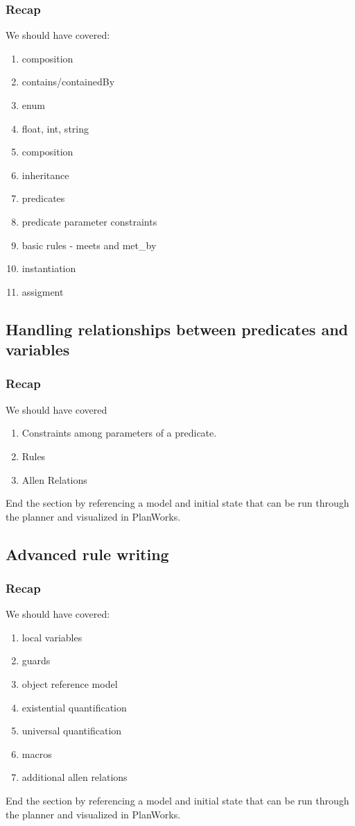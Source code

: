 \documentclass[10pt, letterpaper, twoside]{article}
\begin{document}
\subsubsection{Recap}
We should have covered:
\begin{enumerate}
\item composition
\item contains/containedBy
\item enum
\item float, int, string
\item composition
\item inheritance
\item predicates
\item predicate parameter constraints
\item basic rules - meets and met_by
\item instantiation
\item assigment
\end{enumerate}

\subsection{Handling relationships between predicates and variables}
\subsubsection{Recap}
We should have covered
\begin{enumerate}
\item Constraints among parameters of a predicate.
\item Rules
\item Allen Relations
\end{enumerate}
End the section by referencing a model and initial state that can be run through the planner and visualized in PlanWorks.

\subsection{Advanced rule writing}
\subsubsection{Recap}
We should have covered:
\begin{enumerate}
\item local variables
\item guards
\item object reference model
\item existential quantification
\item universal quantification
\item macros
\item additional allen relations
\end{enumerate}
End the section by referencing a model and initial state that can be run through the planner and visualized in PlanWorks.
\end{document}
